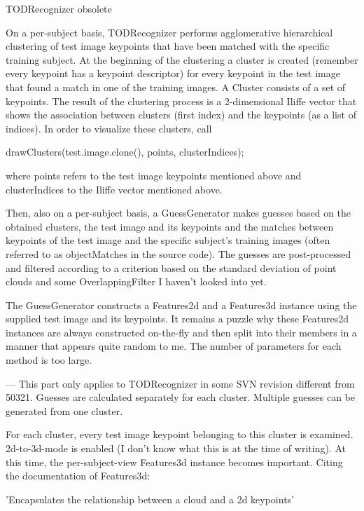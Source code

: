 { \color{gray}

TODRecognizer   obsolete

On a per-subject basis, TODRecognizer performs agglomerative hierarchical
clustering of test image keypoints that have been matched with the specific
training subject. At the beginning of the clustering a cluster is created
(remember every keypoint has a keypoint descriptor) for every keypoint in the
test image that found a match in one of the training images. A Cluster consists
of a set of keypoints. The result of the clustering process is a 2-dimensional
Iliffe vector that shows the association between clusters (first index) and the
keypoints (as a list of indices). In order to visualize these clusters, call

drawClusters(test.image.clone(), points, clusterIndices);

where points refers to the test image keypoints mentioned above and
clusterIndices to the Iliffe vector mentioned above.

Then, also on a per-subject basis, a GuessGenerator makes guesses based on the
obtained clusters, the test image and its keypoints and the matches between
keypoints of the test image and the specific subject's training images (often
referred to as objectMatches in the source code). The guesses are
post-processed and filtered according to a criterion based on the standard
deviation of point clouds and some OverlappingFilter I haven't looked into yet.

The GuessGenerator constructs a Features2d and a Features3d instance using the
supplied test image and its keypoints. It remains a puzzle why these Features2d
instances are always constructed on-the-fly and then split into their members
in a manner that appears quite random to me. The number of parameters for each
method is too large. 

--- This part only applies to TODRecognizer in some SVN revision different from
50321. Guesses are calculated separately for each cluster. Multiple guesses can
be generated from one cluster.

For each cluster, every test image keypoint belonging to this cluster is
examined. 2d-to-3d-mode is enabled (I don't know what this is at the time of
writing). At this time, the per-subject-view Features3d instance becomes
important. Citing the documentation of Features3d:

'Encapsulates the relationship between a cloud and a 2d keypoints'                      

}
